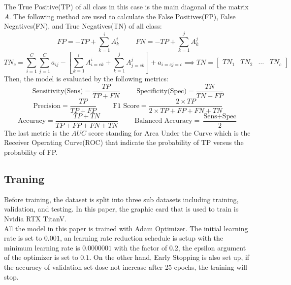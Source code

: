 \documentclass[sensors,article,submit,pdftex,moreauthors]{Definitions/mdpi}
\begin{document}
The True Positive(TP) of all class in this case is the main diagonal of the matrix $A$. The following method are used to calculate the False Positives(FP), False Negatives(FN), and True Negatives(TN) of all class:
\[
FP = -TP + \sum_{k=1}^{i}A^i_k \hspace{1cm} FN = -TP + \sum_{k=1}^{j}A^j_k
\]
\[
TN_c = \sum_{i=1}^{C}\sum_{j=1}^{C}a_{ij} - \left[ \sum_{k=1}^{i}A^i_{i=c k} + \sum_{k=1}^{j}A^j_{j=c k} \right] + a_{i=c j=c} \implies TN = \begin{bmatrix}
	TN_1 & TN_2 & \dots & TN_c
\end{bmatrix}
\]
Then, the model is evaluated by the following metrics:
\[\text{Sensitivity(Sens)} = \frac{TP}{TP + FN} \hspace{1cm} \text{Specificity(Spec)} = \frac{TN}{TN + FP}\]
\[\text{Precision} = \frac{TP}{TP + FP} \hspace{1cm} \text{F1 Score} = \frac{2 \times TP}{2 \times TP + FP + FN + TN}\]
\[\text{Accuracy} = \frac{TP + TN}{TP + FP + FN + TN} \hspace{1cm} \text{Balanced Accuracy} = \frac{\text{Sens} + \text{Spec}}{2}\]
The last metric is the $AUC$ score standing for Area Under the Curve which is the Receiver Operating Curve(ROC) that indicate the probability of TP versus the probability of FP.  
\subsection{Traning}
Before training, the dataset is split into three sub datasets including training, validation, and testing. In this paper, the graphic card that is used to train is Nvidia RTX TitanV.\\
All the model in this paper is trained with Adam Optimizer\cite{6980}. The initial learning rate is set to $0.001$, an learning rate reduction schedule is setup with the minimum learning rate is $0.0000001$ with the factor of $0.2$, the epsilon argument of the optimizer is set to $0.1$. On the other hand, Early Stopping is also set up, if the accuracy of validation set dose not increase after 25 epochs, the training will stop. 

\end{document}
